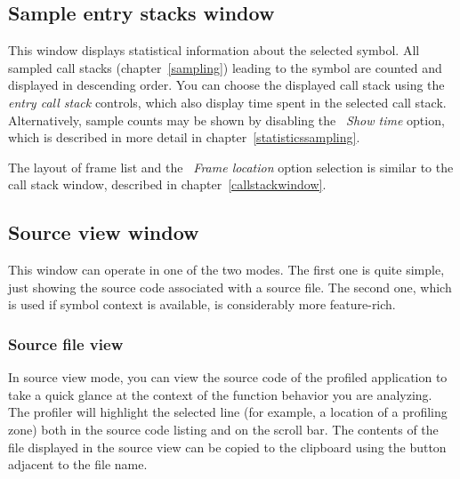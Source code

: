 \documentclass[hidelinks,titlepage,a4paper,twoside]{article}
\begin{document}
\subsection{Sample entry stacks window}
\label{sampleparents}

This window displays statistical information about the selected symbol. All sampled call stacks (chapter~\ref{sampling}) leading to the symbol are counted and displayed in descending order. You can choose the displayed call stack using the \emph{entry call stack} controls, which also display time spent in the selected call stack. Alternatively, sample counts may be shown by disabling the \emph{\faStopwatch{}~Show time} option, which is described in more detail in chapter~\ref{statisticssampling}.

The layout of frame list and the \emph{\faAt{}~Frame location} option selection is similar to the call stack window, described in chapter~\ref{callstackwindow}.

\subsection{Source view window}
\label{sourceview}

This window can operate in one of the two modes. The first one is quite simple, just showing the source code associated with a source file. The second one, which is used if symbol context is available, is considerably more feature-rich.

\subsubsection{Source file view}

In source view mode, you can view the source code of the profiled application to take a quick glance at the context of the function behavior you are analyzing. The profiler will highlight the selected line (for example, a location of a profiling zone) both in the source code listing and on the scroll bar. The contents of the file displayed in the source view can be copied to the clipboard using the button adjacent to the file name.
\end{document}
